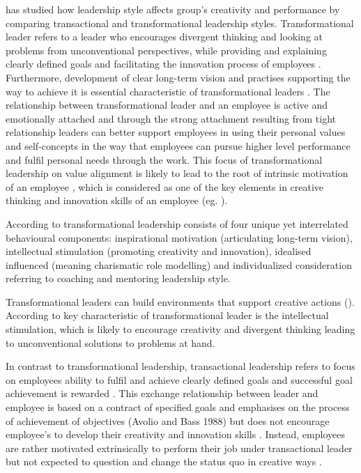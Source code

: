 \citep{jung2001transformational} has studied how leadership style affects group's creativity and performance by comparing transactional and transformational leadership styles. Transformational leader refers to a leader who encourages divergent thinking and looking at problems from unconventional perspectives, while providing and explaining clearly defined goals and facilitating the innovation process of employees \citep{bass1990implications}. Furthermore, development of clear long-term vision and practises supporting the way to achieve it is essential characteristic of transformational leaders \citep{avolio1988transformational}. The relationship between transformational leader and an employee is active and emotionally attached \citep{avolio1988transformational} and through the strong attachment resulting from tight relationship leaders can better support employees in using their personal values and self-concepts in the way that employees can pursue higher level performance and fulfil personal needs through the work. This focus of transformational leadership on value alignment is likely to lead to the root of intrinsic motivation of an employee \citep{gardner1998charismatic}, which is considered as one of the key elements in creative thinking and innovation skills of an employee (eg. \citep{jung2001transformational,amabile1998kill,deciintrinsic}).

According to \citet{bass1997full} transformational leadership consists of four unique yet interrelated behavioural components: inspirational motivation (articulating long-term vision), intellectual stimulation (promoting creativity and innovation), idealised influenced (meaning charismatic role modelling) and individualized consideration referring to coaching and mentoring leadership style. 

Transformational leaders can build environments that support creative actions (\citep{sosik1998transformational,avolio1988transformational}). According to \citet{sosik1998transformational} key characteristic of transformational leader is the intellectual stimulation, which is likely to encourage creativity and divergent thinking leading to unconventional solutions to problems at hand. 

In contrast to transformational leadership, transactional leadership refers to focus on employees ability to fulfil and achieve clearly defined goals \citep{hollander1978leadership,house1971path} and successful goal achievement is rewarded \citep{waldman1990adding}. This exchange relationship between leader and employee is based on a contract of specified goals and emphasises on the process of achievement of objectives (Avolio and Bass 1988) but does not encourage employee's to develop their creativity and innovation skills \citep{jung2001transformational}. Instead, employees are rather motivated extrinsically to perform their job under transactional leader but not expected to question and change the status quo in creative ways \citep{amabile1998kill}.  

